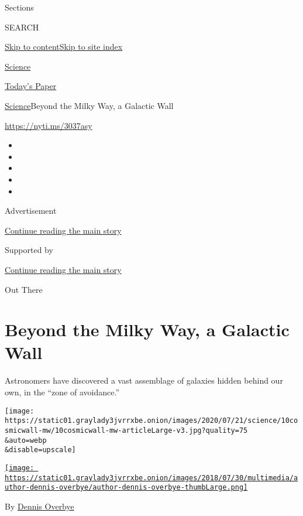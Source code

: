 Sections

SEARCH

\protect\hyperlink{site-content}{Skip to
content}\protect\hyperlink{site-index}{Skip to site index}

\href{https://www.nytimes3xbfgragh.onion/section/science}{Science}

\href{https://myaccount.nytimes3xbfgragh.onion/auth/login?response_type=cookie\&client_id=vi}{}

\href{https://www.nytimes3xbfgragh.onion/section/todayspaper}{Today's
Paper}

\href{/section/science}{Science}\textbar{}Beyond the Milky Way, a
Galactic Wall

\url{https://nyti.ms/3037asy}

\begin{itemize}
\item
\item
\item
\item
\item
\end{itemize}

Advertisement

\protect\hyperlink{after-top}{Continue reading the main story}

Supported by

\protect\hyperlink{after-sponsor}{Continue reading the main story}

Out There

\hypertarget{beyond-the-milky-way-a-galactic-wall}{%
\section{Beyond the Milky Way, a Galactic
Wall}\label{beyond-the-milky-way-a-galactic-wall}}

Astronomers have discovered a vast assemblage of galaxies hidden behind
our own, in the ``zone of avoidance.''

\texttt{[image: https://static01.graylady3jvrrxbe.onion/images/2020/07/21/science/10cosmicwall-mw/10cosmicwall-mw-articleLarge-v3.jpg?quality=75\\\&auto=webp\\\&disable=upscale]}

\href{https://www.nytimes3xbfgragh.onion/by/dennis-overbye}{\texttt{[image: https://static01.graylady3jvrrxbe.onion/images/2018/07/30/multimedia/author-dennis-overbye/author-dennis-overbye-thumbLarge.png]}}

By \href{https://www.nytimes3xbfgragh.onion/by/dennis-overbye}{Dennis
Overbye}


